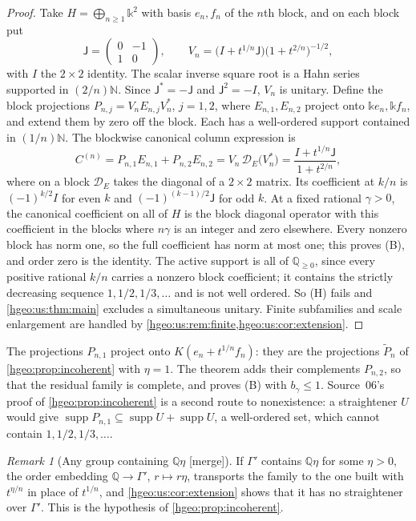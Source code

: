\documentclass[11pt,letterpaper]{article}
\numberwithin{equation}{section}
\theoremstyle{definition}
\theoremstyle{remark}
\newtheorem{remark}[remark]{Remark}
\newcommand{\Q}{\mathbb Q}
\newcommand{\N}{\mathbb N}
\newcommand{\kk}{\mathbb k}
\newcommand{\K}{K}
\newcommand{\supp}{\operatorname{supp}}
\newcommand{\mergetag}{\textup{\textsf{\small[merge]}}}
\newcommand{\Dg}{\mathscr D}
\begin{document}
\begin{proof}
Take $H=\bigoplus_{n\ge1}\kk^2$ with basis $e_n,f_n$ of the $n$th block, and
on each block put
\[
 \mathsf J=\begin{pmatrix}0&-1\\1&0\end{pmatrix},\qquad
 V_n=\bigl(I+t^{1/n}\mathsf J\bigr)\bigl(1+t^{2/n}\bigr)^{-1/2},
\]
with $I$ the $2\times2$ identity. The scalar inverse square root is a Hahn
series supported in $(2/n)\N$. Since $\mathsf J^*=-\mathsf J$ and
$\mathsf J^2=-I$, $V_n$ is unitary. Define the block projections
$P_{n,j}=V_nE_{n,j}V_n^*$, $j=1,2$, where $E_{n,1},E_{n,2}$ project onto
$\kk e_n,\kk f_n$, and extend them by zero off the block. Each has a
well-ordered support contained in $(1/n)\N$. The blockwise canonical column
expression is
\begin{equation}\label{hgeo:us:eq:rationalblock}
 C^{(n)}=P_{n,1}E_{n,1}+P_{n,2}E_{n,2}=V_n\,\Dg_E\bigl(V_n^*\bigr)
 =\frac{I+t^{1/n}\mathsf J}{1+t^{2/n}},
\end{equation}
where on a block $\Dg_E$ takes the diagonal of a $2\times2$ matrix. Its coefficient at
$k/n$ is $(-1)^{k/2}I$ for even $k$ and $(-1)^{(k-1)/2}\mathsf J$ for odd $k$.
At a fixed rational $\gamma>0$, the canonical coefficient on all of $H$ is the
block diagonal operator with this coefficient in the blocks where $n\gamma$ is
an integer and zero elsewhere. Every nonzero block has norm one, so the full
coefficient has norm at most one; this proves (B), and order zero is the
identity. The active support is all of $\Q_{\ge0}$, since every positive
rational $k/n$ carries a nonzero block coefficient; it contains the strictly
decreasing sequence $1,1/2,1/3,\ldots$ and is not well ordered. So (H) fails
and \cref{hgeo:us:thm:main} excludes a simultaneous unitary. Finite
subfamilies and scale enlargement are handled by
\cref{hgeo:us:rem:finite,hgeo:us:cor:extension}.
\end{proof}

The projections $P_{n,1}$ project onto $\K(e_n+t^{1/n}f_n)$: they are the
projections $\widetilde P_n$ of \cref{hgeo:prop:incoherent} with $\eta=1$.
The theorem adds their complements $P_{n,2}$, so that the residual family is
complete, and proves (B) with $b_\gamma\le1$. Source~06's proof of
\cref{hgeo:prop:incoherent} is a second route to nonexistence: a straightener
$U$ would give $\supp P_{n,1}\subseteq\supp U+\supp U$, a well-ordered set,
which cannot contain $1,1/2,1/3,\ldots$.

\begin{remark}[Any group containing $\Q\eta$ \mergetag]
\label{hgeo:us:rem:transport}
If $\Gamma'$ contains $\Q\eta$ for some $\eta>0$, the order embedding
$\Q\to\Gamma'$, $r\mapsto r\eta$, transports the family to the one built with
$t^{\eta/n}$ in place of $t^{1/n}$, and \cref{hgeo:us:cor:extension} shows that
it has no straightener over $\Gamma'$. This is the hypothesis of
\cref{hgeo:prop:incoherent}.
\end{remark}
\end{document}
